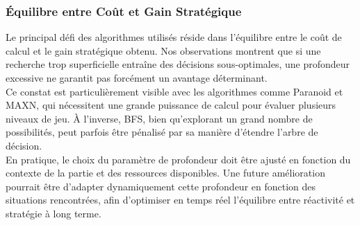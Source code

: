 \newpage

\subsubsection{Équilibre entre Coût et Gain Stratégique}
Le principal défi des algorithmes utilisés réside dans l’équilibre entre le coût de calcul et le gain stratégique obtenu. Nos observations montrent que si une recherche trop superficielle entraîne des décisions sous-optimales, une profondeur excessive ne garantit pas forcément un avantage déterminant. \\
Ce constat est particulièrement visible avec les algorithmes comme Paranoid et MAXN, qui nécessitent une grande puissance de calcul pour évaluer plusieurs niveaux de jeu. À l’inverse, BFS, bien qu’explorant un grand nombre de possibilités, peut parfois être pénalisé par sa manière d’étendre l’arbre de décision. \\
En pratique, le choix du paramètre de profondeur doit être ajusté en fonction du contexte de la partie et des ressources disponibles. Une future amélioration pourrait être d’adapter dynamiquement cette profondeur en fonction des situations rencontrées, afin d’optimiser en temps réel l’équilibre entre réactivité et stratégie à long terme.